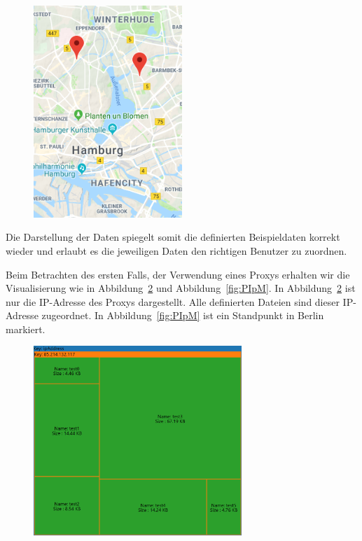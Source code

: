 \documentclass[
    fontsize=12pt,
    headings=small,
    parskip=half,           %
    bibliography=totoc,
    numbers=noenddot,       %
    open=any,               %
    ]{scrreprt}
\begin{document}
\begin{figure}[H]
\includegraphics[width=0.5\textwidth , height=0.4\textheight]{../pic/IP-Proxy-SetA.PNG}
\label{fig:ungIpM}
\end{figure}

Die Darstellung der Daten spiegelt somit die definierten Beispieldaten korrekt wieder und erlaubt es die jeweiligen Daten den richtigen Benutzer zu zuordnen.


Beim Betrachten des ersten Falls, der Verwendung eines Proxys erhalten wir die Visualisierung wie in Abbildung~\ref{fig:PIpTM} und Abbildung~\ref{fig:PIpM}.
In Abbildung~\ref{fig:PIpTM} ist nur die IP-Adresse des Proxys dargestellt.
Alle definierten Dateien sind dieser IP-Adresse zugeordnet. 
In Abbildung~\ref{fig:PIpM} ist ein Standpunkt in Berlin markiert.

\begin{figure}[H]
\includegraphics[width=0.7\textwidth]{../pic/IP-Proxy-SetB-tree2.PNG}
\label{fig:PIpTM}
\end{figure}
\end{document}
